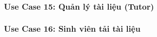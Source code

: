 \newpage
\subsubsection*{Use Case 15: Quản lý tài liệu (Tutor)}
\begin{samepage}

\end{samepage}


\newpage
\subsubsection*{Use Case 16: Sinh viên tải tài liệu}
\begin{samepage}

\end{samepage}


